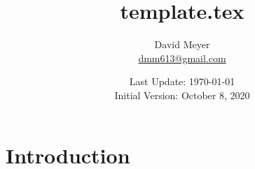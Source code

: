 \documentclass{article}
\title{template.tex}
\author{David Meyer \\ 
	{\small \vspace{-2.75mm} \href{mailto:dmm613@gmail.com}{dmm613@gmail.com}}}
\date{Last Update: \today \\
	{\small \vspace{1.00mm} Initial Version: October 8, 2020}}
\theoremstyle{definition}
\begin{document}
\maketitle
%
%
%
\section{Introduction}
\label{section:introduction}
%
%
%
%
%
%
%
%
%
%
%	
%
\end{document}
